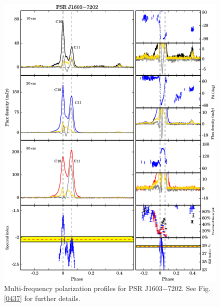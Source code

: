 \documentclass[useAMS,usenatbib]{mn2e}
\begin{document}
\begin{appendices}
\begin{figure}
\begin{center}
\includegraphics[width=6 in]{1603.ps}
\caption{Multi-frequency polarization profiles for PSR J1603$-$7202. 
See Fig. \ref{0437} for further details.}
\label{1603}
\end{center}
\end{figure}


\end{appendices}
\end{document}
